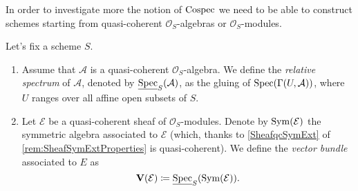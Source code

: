 \noindent
In order to investigate more the notion of $\operatorname{Cospec}$ we need to 
be able to construct schemes starting from quasi-coherent $\mathcal{O}_{ S }$-algebras
or $\mathcal{O}_{ S }$-modules.


\begin{defn}
	Let's fix a scheme $S$.
\begin{enumerate}
	\item Assume that $\mathcal{A}$ is a quasi-coherent $\mathcal{O}_{ S }$-algebra.
		We define the \emph{relative spectrum} of $\mathcal{A}$, denoted by
		$\underline{\operatorname{Spec}}_S(\mathcal{A})$, as the gluing of
		$\operatorname{Spec}(\Gamma(U, \mathcal{A}))$, where $U$ ranges
		over all affine open subsets of $S$.

	\item  Let $\mathcal{E}$ be a quasi-coherent sheaf of $\mathcal{O}_{ S }$-modules.
		Denote by $\operatorname{Sym}(\mathcal{E})$ the symmetric algebra associated to 
		$\mathcal{E}$ (which, thanks to \cref{SheafqcSymExt} of
		\cref{rem:SheafSymExtProperties} is quasi-coherent).
		We define the \emph{vector bundle} associated to $E$ as
		\begin{equation*}
			\mathbf{V}(\mathcal{E}) \coloneqq
			\underline{\operatorname{Spec}}_S (\operatorname{Sym}(\mathcal{E}))
		.\end{equation*}
\end{enumerate}
\end{defn}


